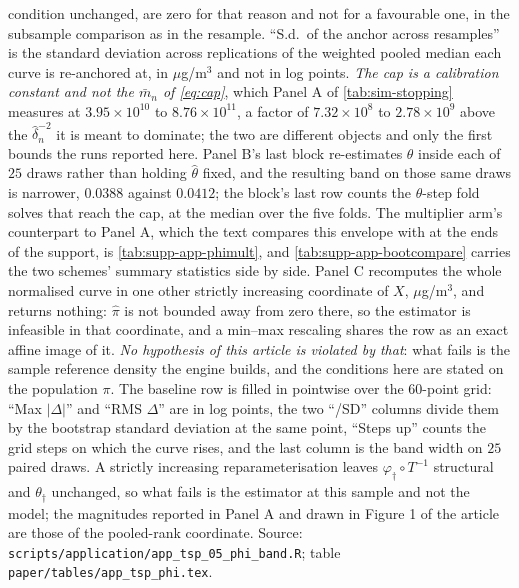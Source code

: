 \documentclass[
  12pt]{article}
\newcommand{\1}[1]{\mathds{1}\left[#1\right]}
\theoremstyle{plain}
\theoremstyle{definition}
\theoremstyle{definition}
\theoremstyle{remark}
\newcommand{\vdagger}{\varphi_{\dagger}}
\begin{document}
\begin{table}
\begin{threeparttable}
\begin{tablenotes}
condition unchanged, are zero for that reason and not for a favourable one, in
the subsample comparison as in the resample. ``S.d.\ of the anchor across
resamples'' is the standard deviation across replications of the weighted pooled
median each curve is re-anchored at, in $\mu$g/m$^3$ and not in log points.
\emph{The cap is a calibration constant and not the $\bar m_n$ of
\eqref{eq:cap}}, which Panel A of \cref{tab:sim-stopping} measures at
$3.95\times10^{10}$ to
$8.76\times10^{11}$, a factor of $7.32\times10^{8}$ to $2.78\times10^{9}$ above
the $\hat\delta_n^{-2}$ it is meant to dominate; the two are different objects
and only the first bounds the runs reported here. Panel B's last block re-estimates $\theta$ inside each of $25$
draws rather than holding $\hat\theta$ fixed, and the resulting band on those
same draws is narrower, $0.0388$ against $0.0412$; the block's last row
counts the $\theta$-step fold solves that reach the cap, at the median over the
five folds. The multiplier arm's counterpart to Panel A, which the text compares
this envelope with at the ends of the support, is \cref{tab:supp-app-phimult},
and \cref{tab:supp-app-bootcompare} carries the two schemes' summary statistics side
by side. Panel C recomputes the whole
normalised curve in one other strictly increasing coordinate of $X$,
$\mu$g/m$^3$, and returns nothing: $\hat\pi$ is not bounded away from zero
there, so the estimator is infeasible in that coordinate, and a min--max
rescaling shares the row as an exact affine image of it. \emph{No hypothesis of
this article is violated by that}: what fails is the sample reference density the
engine builds, and the conditions here are stated on the population $\pi$. The baseline
row is filled in pointwise over the $60$-point grid: ``Max $|\Delta|$'' and
``RMS $\Delta$'' are in log points, the two ``/SD'' columns divide them by the
bootstrap standard deviation at the same point, ``Steps up'' counts the grid
steps on which the curve rises, and the last column is the band width on $25$
paired draws. A strictly increasing reparameterisation leaves
$\vdagger\circ T^{-1}$ structural and $\theta_\dagger$ unchanged, so what fails
is the estimator at this sample and not the model; the magnitudes reported in
Panel A and drawn in Figure 1 of the article are those of the pooled-rank
coordinate. Source:
\texttt{scripts/application/app\_tsp\_05\_phi\_band.R}; table
\texttt{paper/tables/app\_tsp\_phi.tex}.
\end{tablenotes}
\end{threeparttable}
\end{table}
\end{document}
